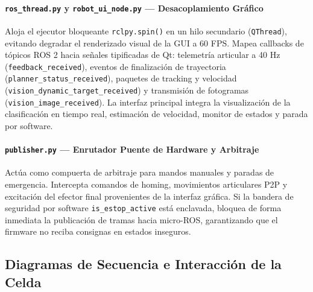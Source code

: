 \documentclass[12pt, a4paper]{report}
\begin{document}
\paragraph{\texttt{ros\_thread.py} y \texttt{robot\_ui\_node.py} --- Desacoplamiento Gráfico}
Aloja el ejecutor bloqueante \texttt{rclpy.spin()} en un hilo secundario (\texttt{QThread}), evitando degradar el renderizado visual de la GUI a 60 FPS. Mapea callbacks de tópicos ROS 2 hacia señales tipificadas de Qt: telemetría articular a 40 Hz (\texttt{feedback\_received}), eventos de finalización de trayectoria (\texttt{planner\_status\_received}), paquetes de tracking y velocidad (\texttt{vision\_dynamic\_target\_received}) y transmisión de fotogramas (\texttt{vision\_image\_received}). La interfaz principal integra la visualización de la clasificación en tiempo real, estimación de velocidad, monitor de estados y parada por software.

\paragraph{\texttt{publisher.py} --- Enrutador Puente de Hardware y Arbitraje}
Actúa como compuerta de arbitraje para mandos manuales y paradas de emergencia. Intercepta comandos de homing, movimientos articulares P2P y excitación del efector final provenientes de la interfaz gráfica. Si la bandera de seguridad por software \texttt{is\_estop\_active} está enclavada, bloquea de forma inmediata la publicación de tramas hacia micro-ROS, garantizando que el firmware no reciba consignas en estados inseguros.

\subsection{Diagramas de Secuencia e Interacción de la Celda}
\end{document}
